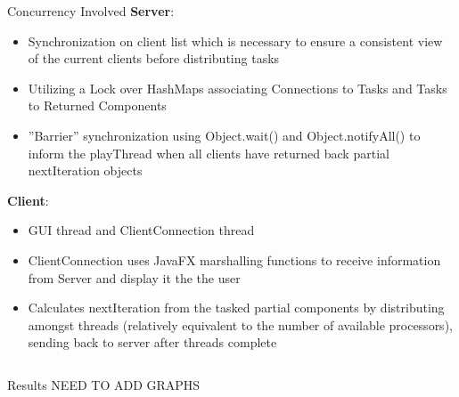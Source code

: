 \documentclass[final]{beamer}
\newlength{\onecolwid}
\newlength{\twocolwid}
\begin{document}
\begin{frame}[t]
\begin{columns}[t]
\begin{column}{\twocolwid}
\begin{columns}[t,totalwidth=\twocolwid]
\begin{column}{\onecolwid}
\begin{block}{Concurrency Involved}
\textbf{Server}:
\begin{itemize}
\item Synchronization on client list which is necessary to ensure a consistent view of the current clients before distributing tasks
\item Utilizing a Lock over HashMaps associating Connections to Tasks and Tasks to Returned Components
\item ''Barrier'' synchronization using Object.wait() and Object.notifyAll() to inform the playThread when all clients have returned back partial nextIteration objects
\end{itemize}
\textbf{Client}:
\begin{itemize}
\item GUI thread and ClientConnection thread
\item ClientConnection uses JavaFX marshalling functions to receive information from Server and display it the the user
\item Calculates nextIteration from the tasked partial components by distributing amongst threads (relatively equivalent to the number of available processors), sending back to server after threads complete
\end{itemize}
\end{block}


\end{column} %

\end{columns} %

\begin{columns}[t,totalwidth=\twocolwid] %

\begin{column}{\twocolwid} %


\begin{block}{Results}
NEED TO ADD GRAPHS
\end{block}



\end{column}
\end{columns}
\end{column}
\end{columns}
\end{frame}
\end{document}
